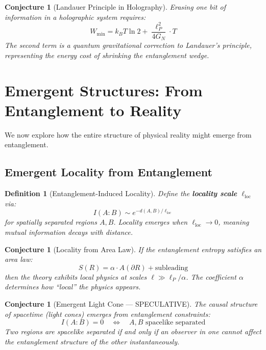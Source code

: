 \documentclass[12pt,a4paper]{article}
\newtheorem{conjecture}[theorem]{Conjecture}
\newtheorem{definition}[theorem]{Definition}
\begin{document}
\begin{conjecture}[Landauer Principle in Holography]
Erasing one bit of information in a holographic system requires:
\begin{equation}
W_{\text{min}} = k_B T \ln 2 + \frac{\ell_P^2}{4G_N} \cdot T
\end{equation}
The second term is a quantum gravitational correction to Landauer's principle, representing the energy cost of shrinking the entanglement wedge.
\end{conjecture}

\section{Emergent Structures: From Entanglement to Reality}

We now explore how the entire structure of physical reality might emerge from entanglement.

\subsection{Emergent Locality from Entanglement}

\begin{definition}[Entanglement-Induced Locality]
Define the \textbf{locality scale} $\ell_{\text{loc}}$ via:
\begin{equation}
I(A:B) \sim e^{-d(A,B)/\ell_{\text{loc}}}
\end{equation}
for spatially separated regions $A, B$. Locality emerges when $\ell_{\text{loc}} \to 0$, meaning mutual information decays with distance.
\end{definition}

\begin{conjecture}[Locality from Area Law]
If the entanglement entropy satisfies an area law:
\begin{equation}
S(R) = \alpha \cdot A(\partial R) + \text{subleading}
\end{equation}
then the theory exhibits local physics at scales $\ell \gg \ell_P/\alpha$. The coefficient $\alpha$ determines how ``local'' the physics appears.
\end{conjecture}

\begin{conjecture}[Emergent Light Cone --- SPECULATIVE]
The causal structure of spacetime (light cones) emerges from entanglement constraints:
\begin{equation}
I(A:B) = 0 \quad \Leftrightarrow \quad A, B \text{ spacelike separated}
\end{equation}
Two regions are spacelike separated if and only if an observer in one cannot affect the entanglement structure of the other instantaneously.
\end{conjecture}
\end{document}
